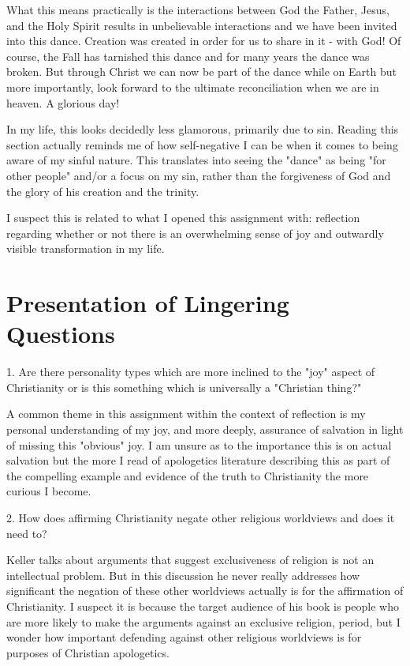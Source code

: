 \documentclass[12pt]{turabian-researchpaper}
\begin{document}
What this means practically is the interactions between God the Father, Jesus, and the Holy Spirit results in unbelievable interactions and we have been invited into this dance. Creation was created in order for us to share in it - with God! Of course, the Fall has tarnished this dance and for many years the dance was broken. But through Christ we can now be part of the dance while on Earth but more importantly, look forward to the ultimate reconciliation when we are in heaven. A glorious day!

In my life, this looks decidedly less glamorous, primarily due to sin. Reading this section actually reminds me of how self-negative I can be when it comes to being aware of my sinful nature. This translates into seeing the "dance" as being "for other people" and/or a focus on my sin, rather than the forgiveness of God and the glory of his creation and the trinity.

I suspect this is related to what I opened this assignment with: reflection regarding whether or not there is an overwhelming sense of joy and outwardly visible transformation in my life. 

\section{Presentation of Lingering Questions}

1. Are there personality types which are more inclined to the "joy" aspect of Christianity or is this something which is universally a "Christian thing?"

A common theme in this assignment within the context of reflection is my personal understanding of my joy, and more deeply, assurance of salvation in light of missing this "obvious" joy. I am unsure as to the importance this is on actual salvation but the more I read of apologetics literature describing this as part of the compelling example and evidence of the truth to Christianity the more curious I become.

2. How does affirming Christianity negate other religious worldviews and does it need to?

Keller talks about arguments that suggest exclusiveness of religion is not an intellectual problem. But in this discussion\autocite[pg.11-13]{keller2008reason} he never really addresses how significant the negation of these other worldviews actually is for the affirmation of Christianity. I suspect it is because the target audience of his book is people who are more likely to make the arguments against an exclusive religion, period, but I wonder how important defending against other religious worldviews is for purposes of Christian apologetics.
\end{document}
